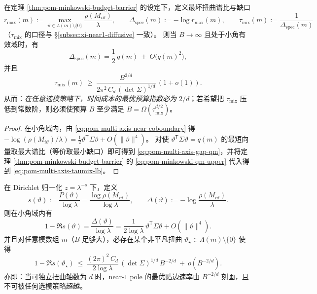 \begin{corollary}[谱缺口与混合时间的预算指数障碍]\label{cor:pom-multi-axis-mixing-budget-barrier}
在定理 \ref{thm:pom-minkowski-budget-barrier} 的设定下，定义最坏扭曲谱比与缺口
\[
r_{\max}(m):=\max_{\vartheta\in \Lambda(m)\setminus\{0\}}\frac{\rho(M_{i\vartheta})}{\lambda},
\qquad
\Delta_{\mathrm{spec}}(m):=-\log r_{\max}(m),
\qquad
\tau_{\mathrm{mix}}(m):=\frac{1}{\Delta_{\mathrm{spec}}(m)}
\]
（\(\tau_{\mathrm{mix}}\) 的口径与 \S\ref{subsec:xi-near1-diffusive} 一致）。
则当 \(B\to\infty\) 且处于小角有效域时，有
\begin{equation}\label{eq:pom-multi-axis-gap-qm}
\Delta_{\mathrm{spec}}(m)=\frac12\,q(m)\ +\ O\!\bigl(q(m)^2\bigr),
\end{equation}
并且
\begin{equation}\label{eq:pom-multi-axis-taumix-lb}
\tau_{\mathrm{mix}}(m)\ \ge\ \frac{B^{2/d}}{2\pi^2\,C_d\,(\det\Sigma)^{1/d}}\,(1+o(1)).
\end{equation}
从而：\emph{在任意选模策略下，时间成本的最优预算指数必为 \(2/d\)}；若希望把 \(\tau_{\mathrm{mix}}\) 压低到常数阶，则必须使预算 \(B\) 至少满足 \(B=\Omega(\tau_{\mathrm{mix}}^{d/2})\)。
\end{corollary}

\begin{proof}
在小角域内，由 \eqref{eq:pom-multi-axis-near-coboundary} 得
\(
-\log(\rho(M_{i\vartheta})/\lambda)=\frac12\vartheta^{\mathsf T}\Sigma\vartheta+O(\|\vartheta\|^4)
\)。
对使 \(\vartheta^{\mathsf T}\Sigma\vartheta=q(m)\) 的最短向量取最大谱比（等价取最小缺口）即可得到 \eqref{eq:pom-multi-axis-gap-qm}，并将定理 \ref{thm:pom-minkowski-budget-barrier} 的 \eqref{eq:pom-minkowski-qm-upper} 代入得到 \eqref{eq:pom-multi-axis-taumix-lb}。
\end{proof}

\begin{corollary}\label{cor:pom-multi-axis-near1-pole-barrier}
在 Dirichlet 归一化 \(z=\lambda^{-s}\) 下，定义
\[
s(\vartheta):=\frac{P(\vartheta)}{\log\lambda}
=\frac{\log\rho(M_{i\vartheta})}{\log\lambda},
\qquad
\Delta(\vartheta):=-\log\frac{\rho(M_{i\vartheta})}{\lambda}.
\]
则在小角域内有
\begin{equation}\label{eq:pom-multi-axis-near1-pole-translate}
1-\Re s(\vartheta)=\frac{\Delta(\vartheta)}{\log\lambda}
=\frac{1}{2\log\lambda}\,\vartheta^{\mathsf T}\Sigma\vartheta+O(\|\vartheta\|^4).
\end{equation}
并且对任意模数组 \(m\)（\(B\) 足够大），必存在某个非平凡扭曲 \(\vartheta_\star\in \Lambda(m)\setminus\{0\}\) 使得
\begin{equation}\label{eq:pom-multi-axis-near1-pole-budget}
1-\Re s(\vartheta_\star)
\ \le\
\frac{(2\pi)^2\,C_d}{2\log\lambda}\,(\det\Sigma)^{1/d}\,B^{-2/d}\ +\ o(B^{-2/d}).
\end{equation}
亦即：当可独立扭曲轴数为 \(d\) 时，near-\(1\) pole 的最优贴边速率由 \(B^{-2/d}\) 刻画，且不可被任何选模策略超越。
\end{corollary}


